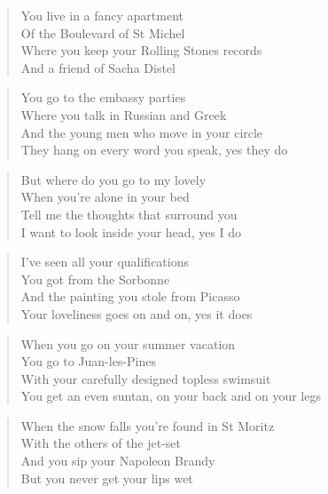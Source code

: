 \documentclass[9pt,a4paper,oneside, onecolumn]{article}
\begin{document}
\begin{multicols}{2}

\begin{verse}
You live in a fancy apartment\\
Of the Boulevard of St Michel\\
Where you keep your Rolling Stones records\\
And a friend of Sacha Distel\\
\end{verse}

\begin{verse}
You go to the embassy parties\\
Where you talk in Russian and Greek\\
And the young men who move in your circle\\
They hang on every word you speak, yes they do\\
\end{verse}

\begin{verse}
But where do you go to my lovely\\
When you're alone in your bed\\
Tell me the thoughts that surround you\\
I want to look inside your head, yes I do\\
\end{verse}

\begin{verse}
I've seen all your qualifications\\
You got from the Sorbonne\\
And the painting you stole from Picasso\\
Your loveliness goes on and on, yes it does\\
\end{verse}

\begin{verse}
When you go on your summer vacation\\
You go to Juan-les-Pines\\
With your carefully designed topless swimsuit\\
You get an even suntan, on your back and on your legs\\
\end{verse}

\begin{verse}
When the snow falls you're found in St Moritz\\
With the others of the jet-set\\
And you sip your Napoleon Brandy\\
But you never get your lips wet\\
\end{verse}


\end{multicols}
\end{document}
